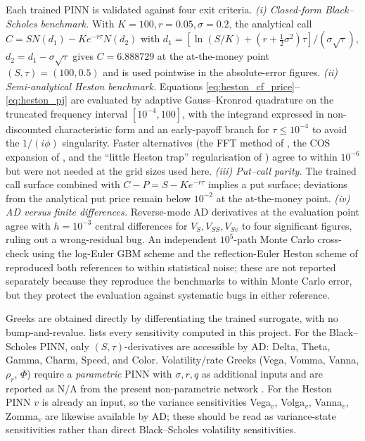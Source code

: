 Each trained PINN is validated against four exit criteria. \emph{(i) Closed-form Black--Scholes benchmark.} With $K=100,r=0.05,\sigma=0.2$, the analytical call $C=SN(d_1)-Ke^{-r\tau}N(d_2)$ with $d_1=[\ln(S/K)+(r+\tfrac{1}{2}\sigma^2)\tau]/(\sigma\sqrt{\tau})$, $d_2=d_1-\sigma\sqrt{\tau}$ \parencite{black1973pricing} gives $C=6.888729$ at the at-the-money point $(S,\tau)=(100,0.5)$ and is used pointwise in the absolute-error figures. \emph{(ii) Semi-analytical Heston benchmark.} Equations \eqref{eq:heston_cf_price}--\eqref{eq:heston_pj} are evaluated by adaptive Gauss--Kronrod quadrature on the truncated frequency interval $[10^{-4},100]$, with the integrand expressed in non-discounted characteristic form and an early-payoff branch for $\tau\le 10^{-4}$ to avoid the $1/(i\phi)$ singularity. Faster alternatives (the FFT method of \textcite{carr1999fft}, the COS expansion of \textcite{fang2008cos}, and the ``little Heston trap'' regularisation of \textcite{albrecher2007heston}) agree to within $10^{-6}$ but were not needed at the grid sizes used here. \emph{(iii) Put--call parity.} The trained call surface combined with $C-P=S-Ke^{-r\tau}$ implies a put surface; deviations from the analytical put price remain below $10^{-2}$ at the at-the-money point. \emph{(iv) AD versus finite differences.} Reverse-mode AD derivatives at the evaluation point agree with $h=10^{-3}$ central differences for $V_S, V_{SS}, V_{Sv}$ to four significant figures, ruling out a wrong-residual bug. An independent $10^5$-path Monte Carlo cross-check \parencite{glasserman2003monte} using the log-Euler GBM scheme and the reflection-Euler Heston scheme of \textcite{andersen2008simple,lord2010comparison} reproduced both references to within statistical noise; these are not reported separately because they reproduce the benchmarks to within Monte Carlo error, but they protect the evaluation against systematic bugs in either reference.

Greeks are obtained directly by differentiating the trained surrogate, with no bump-and-revalue.  lists every sensitivity computed in this project. For the Black--Scholes PINN, only $(S,\tau)$-derivatives are accessible by AD: Delta, Theta, Gamma, Charm, Speed, and Color. Volatility/rate Greeks (Vega, Vomma, Vanna, $\rho_r$, $\Phi$) require a \emph{parametric} PINN with $\sigma,r,q$ as additional inputs and are reported as N/A from the present non-parametric network \parencite{lewis2025pinnsoptions}. For the Heston PINN $v$ is already an input, so the variance sensitivities Vega$_v$, Volga$_v$, Vanna$_v$, Zomma$_v$ are likewise available by AD; these should be read as variance-state sensitivities rather than direct Black--Scholes volatility sensitivities.

